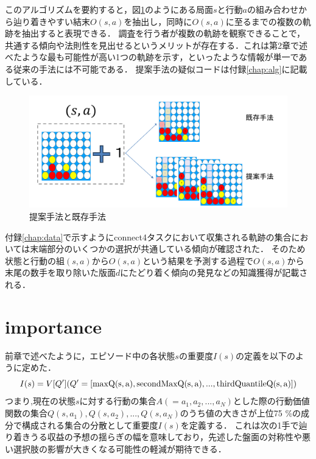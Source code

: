 このアルゴリズムを要約すると，図\ref{fig:merit}のようにある局面$s$と行動$a$の組み合わせから辿り着きやすい結末$O(s, a)$を抽出し，同時に$O(s, a)$に至るまでの複数の軌跡を抽出すると表現できる．
調査を行う者が複数の軌跡を観察できることで，
共通する傾向や法則性を見出せるというメリットが存在する．これは第2章で述べたような最も可能性が高い1つの軌跡を示す，といったような情報が単一である従来の手法には不可能である．
提案手法の疑似コードは付録\ref{chap:alg}に記載している．

\begin{figure}[htbp]
    \includegraphics[width=400pt]{./figure/merit.png}
	\caption{提案手法と既存手法}
	\label{fig:merit}
\end{figure}




付録\ref{chap:data}で示すようにconnect4タスクにおいて収集される軌跡の集合においては末端部分のいくつかの選択が共通している傾向が確認された．
そのため状態と行動の組$(s, a)$から$O(s, a)$という結果を予測する過程で$O(s, a)$から末尾の数手を取り除いた版面$d$にたどり着く傾向の発見などの知識獲得が記載される．
\section{importance}
前章で述べたように，エピソード中の各状態$s$の重要度$I(s)$の定義を以下のように定めた．
\begin{equation}
    \label{new-imp}
	{I(s)=V[Q'] (Q'=[\rm{max}Q(s, a), \rm{secondMax}Q(s, a), ..., \rm{thirdQuantile}Q(s, a)])}
\end{equation}
つまり,現在の状態$s$に対する行動の集合$A(={a_1, a_2, ..., a_N})$とした際の行動価値関数の集合${Q(s, a_1), Q(s, a_2), ..., Q(s, a_N)}$のうち値の大きさが上位75
\%の成分で構成される集合の分散として重要度$I(s)$を定義する．
これは次の1手で辿り着きうる収益の予想の揺らぎの幅を意味しており，先述した盤面の対称性や悪い選択肢の影響が大きくなる可能性の軽減が期待できる．

